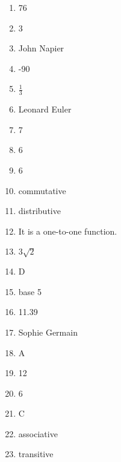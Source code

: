 \documentclass[../uilmath.tex]{subfiles}
\begin{document}
\begin{enumerate}[label=\bfseries\arabic*.]
    \item %
    76

    \item %
    3

    \item %
    John Napier 

    \item %
    -90

    \item %
    $\frac{1}{3}$

    \item %
    Leonard Euler 

    \item %
    7

    \item %
    6

    \item %
    6

    \item %
    commutative 

    \item %
    distributive

    \item %
    It is a one-to-one function.

    \item %
    $3\sqrt{2}$

    \item %
    D 

    \item %
    base 5 

    \item %
    11.39 

    \item %
    Sophie Germain 

    \item %
    A 

    \item %
    12 

    \item %
    6

    \item %
    C 

    \item %
    associative 

    \item %
    transitive 


\end{enumerate}
\end{document}
